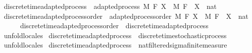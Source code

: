 \begin{isabellebody}
\isamarkupfalse%
\ discrete{\isacharunderscore}{\kern0pt}time{\isacharunderscore}{\kern0pt}adapted{\isacharunderscore}{\kern0pt}process\ {\isacharequal}{\kern0pt}\ adapted{\isacharunderscore}{\kern0pt}process\ M\ F\ X\ \ M\ F\ \ X\ {\isacharcolon}{\kern0pt}{\isacharcolon}{\kern0pt}\ {\isachardoublequoteopen}nat\ {\isasymRightarrow}\ {\isacharunderscore}{\kern0pt}\ {\isasymRightarrow}\ {\isacharunderscore}{\kern0pt}{\isachardoublequoteclose}\isanewline
{}\isamarkupfalse%
\ discrete{\isacharunderscore}{\kern0pt}time{\isacharunderscore}{\kern0pt}adapted{\isacharunderscore}{\kern0pt}process{\isacharunderscore}{\kern0pt}order\ {\isacharequal}{\kern0pt}\ adapted{\isacharunderscore}{\kern0pt}process{\isacharunderscore}{\kern0pt}order\ M\ F\ X\ \ M\ F\ \ X\ {\isacharcolon}{\kern0pt}{\isacharcolon}{\kern0pt}\ {\isachardoublequoteopen}nat\ {\isasymRightarrow}\ {\isacharunderscore}{\kern0pt}\ {\isasymRightarrow}\ {\isacharunderscore}{\kern0pt}{\isachardoublequoteclose}\isanewline
\isanewline
{}\isamarkupfalse%
\ discrete{\isacharunderscore}{\kern0pt}time{\isacharunderscore}{\kern0pt}adapted{\isacharunderscore}{\kern0pt}process{\isacharunderscore}{\kern0pt}order\ {\isasymsubseteq}\ discrete{\isacharunderscore}{\kern0pt}time{\isacharunderscore}{\kern0pt}adapted{\isacharunderscore}{\kern0pt}process%
\isadelimproof
\ %
\endisadelimproof
%
\isatagproof
{}\isamarkupfalse%
\ {\isacharparenleft}{\kern0pt}unfold{\isacharunderscore}{\kern0pt}locales{\isacharparenright}{\kern0pt}%
\endisatagproof
{\isafoldproof}%
%
\isadelimproof
%
\endisadelimproof
\isanewline
{}\isamarkupfalse%
\ discrete{\isacharunderscore}{\kern0pt}time{\isacharunderscore}{\kern0pt}adapted{\isacharunderscore}{\kern0pt}process\ {\isasymsubseteq}\ discrete{\isacharunderscore}{\kern0pt}time{\isacharunderscore}{\kern0pt}stochastic{\isacharunderscore}{\kern0pt}process%
\isadelimproof
\ %
\endisadelimproof
%
\isatagproof
{}\isamarkupfalse%
\ {\isacharparenleft}{\kern0pt}unfold{\isacharunderscore}{\kern0pt}locales{\isacharparenright}{\kern0pt}%
\endisatagproof
{\isafoldproof}%
%
\isadelimproof
%
\endisadelimproof
\isanewline
{}\isamarkupfalse%
\ discrete{\isacharunderscore}{\kern0pt}time{\isacharunderscore}{\kern0pt}adapted{\isacharunderscore}{\kern0pt}process\ {\isasymsubseteq}\ nat{\isacharunderscore}{\kern0pt}filtered{\isacharunderscore}{\kern0pt}sigma{\isacharunderscore}{\kern0pt}finite{\isacharunderscore}{\kern0pt}measure%
\isadelimproof

\end{isabellebody}
